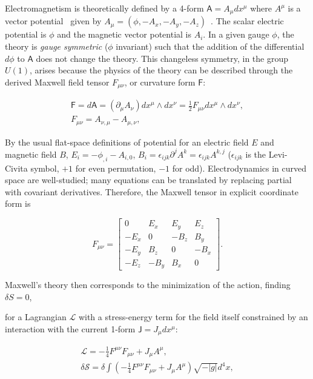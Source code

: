     Electromagnetism is theoretically defined by a 4-form $\textsf{A} = A_\mu d x^\mu$ where $A^\mu$ is a vector potential~\cite{MisnerThorneWheeler} given by $A_\mu = (\phi, -A_x, -A_y, -A_z)$~\cite{GriffithsE}. 
The scalar electric potential is $\phi$ and the magnetic vector potential is $A_i$.
In a given gauge $\phi$, the theory is \textit{gauge symmetric} ($\phi$ invariant) such that the addition of the differential $d \phi$ to $\textsf{A}$ does not change the theory. 
This changeless symmetry, in the group $U(1)$, arises because the physics of the theory can be described through the derived Maxwell field tensor $F_{\mu \nu}$, or curvature form $\textsf{F}$:

\begin{eqnarray}
\textsf{F} = d \textsf{A} = (\partial_\mu A_\nu) dx^\mu \wedge dx^\nu = \frac{1}{2} F_{\mu\nu} dx^\mu \wedge dx^\nu, \\
F_{\mu \nu} = A_{\nu,\mu} - A_{\mu,\nu},
\end{eqnarray}

By the usual flat-space definitions of potential for an electric field $E$ and magnetic field $B$, $E_i = -\phi_{,i} - A_{i,0}$, $B_i = \epsilon_{ijk} \partial^j A^k = \epsilon_{ijk} A^{k, j}$ ($\epsilon_{ijk}$ is the Levi-Civita symbol, $+1$ for even permutation, $-1$ for odd). 
Electrodynamics in curved space are well-studied; many equations can be translated by replacing partial with covariant derivatives.
Therefore, the Maxwell tensor in explicit coordinate form is

\begin{equation}
F_{\mu\nu} =
\left[
\begin{array}{cccc}
0 & E_x & E_y & E_z\\
-E_x & 0 & -B_z & B_y \\
-E_y & B_z & 0 & -B_x\\
-E_z & -B_y & B_x & 0
\end{array} \right].
\end{equation}

\noindent Maxwell's theory then corresponds to the minimization of the action, finding $\delta S = 0$,


\noindent for a Lagrangian $\mathcal{L}$ with a stress-energy term for the field itself constrained by an interaction with the current 1-form $\textsf{J} = J_\mu d x^\mu$:

\begin{eqnarray}
\mathcal{L} = - \frac{1}{4} F^{\mu \nu} F_{\mu \nu} + J_\mu A^\mu,\\ 
\delta \mathcal{S} = \delta \int \left( -\frac{1}{4} F^{\mu \nu} F_{\mu \nu} + J_\mu A^\mu \right) \sqrt{-|g|}d^4 x,
\end{eqnarray}

